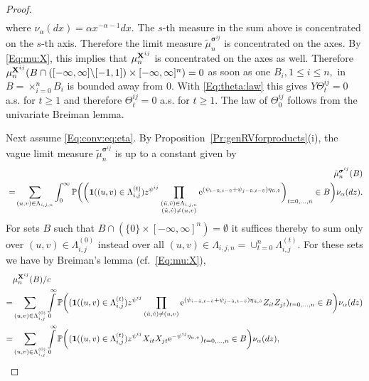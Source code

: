 \begin{proof}
\begin{eqnarray*}
\end{eqnarray*}
where $\nu_\alpha(dx)=\alpha x^{-\alpha-1}dx$. 
The $s$-th measure in the sum above is concentrated on the $s$-th axis. Therefore the limit measure $\tilde{\mu}^{\boldsymbol{\sigma}^{ij}}_n$ is
concentrated on the axes.
By \eqref{Eq:mu:X}, this implies that $\mu_n^{{\bf X}^{ij}}$ is concentrated on the axes as well. Therefore
$\mu_n^{{\bf X}^{ij}}(B \cap ([-\infty,\infty]\backslash [-1,1])\times [-\infty,\infty]^n)=0$ as soon as one $B_i, 1 \leq i \leq n,$ in $B=\times_{i=0}^n B_i$ is bounded away from 0. 
With \eqref{Eq:theta:law} this gives $Y \Theta_t^{ij}=0$ a.s. for $t \geq 1$ and therefore $\Theta_t^{ij}=0$ a.s. for $t \geq 1$. 
The law of $\Theta_0^{ij}$ follows from the univariate Breiman lemma. 
\par
Next assume \eqref{Eq:conv:eq:eta}. By Proposition~\ref{Pr:genRVforproducts}(i),  
the vague limit measure $\tilde{\mu}^{\boldsymbol{\sigma}^{ij}}_n$ is up to a constant given by 
\begin{eqnarray*} && \tilde{\mu}^{\boldsymbol{\sigma}^{ij}}_n(B) \\
&=&\hspace{-0.3cm} \sum_{(u,v) \in \Lambda_{i,j,n}}\int_0^\infty \P\bigg(\bigg(\I((u,v) \in \Lambda_{i,j}^{(t)})z^{\psi^{ij}}\prod_{\substack{(\tilde{u},\tilde{v}) \in \Lambda_{i,j,n} \\ (\tilde{u},\tilde{v}) \neq (u,v)}}\ex^{(\psi_{i-\tilde{u},t-\tilde{v}}+\psi_{j-\tilde{u},t-\tilde{v}})\eta_{\tilde{u},\tilde{v}}}\bigg)_{t=0, \ldots ,n} \in B \bigg)\nu_{\alpha}(dz).\end{eqnarray*}                                                                                                
For sets $B$ such that $B \cap (\{0\} \times [-\infty,\infty]^n)=\emptyset$ it suffices thereby to sum only 
over  $(u,v) \in \Lambda_{i,j}^{(0)}$ instead over all $(u,v) \in \Lambda_{i,j,n}=\cup_{t=0}^n\Lambda_{i,j}^{(t)}$.
For these sets we have by Breiman's lemma (cf.\ \eqref{Eq:mu:X}),
\begin{align*} & \mu^{{\bf X}^{ij}}_n(B)/c\\
= &\sum_{(u,v) \in \Lambda_{i,j}^{(0)}}\int\limits_0^\infty {\mathbb P}\bigg((\mathbf{1}((u,v) \in \Lambda_{i,j}^{(t)})z^{\psi^{ij}}\prod\limits_{(\tilde{u},\tilde{v}) \neq (u,v)}{\rm e}^{(\psi_{i-\tilde{u},t-\tilde{v}}+\psi_{j-\tilde{u},t-\tilde{v}})\eta_{\tilde{u},\tilde{v}}} Z_{it}Z_{jt})_{t=0, \ldots ,n} \in B \bigg)\nu_{\alpha}(dz)\\
= &\sum_{(u,v) \in \Lambda_{i,j}^{(0)}}\int\limits_0^\infty {\mathbb P}\bigg((\mathbf{1}((u,v) \in \Lambda_{i,j}^{(t)})z^{\psi^{ij}}X_{it}X_{jt}{\rm e}^{-\psi^{ij}\eta_{u,v}})_{t=0, \ldots ,n} \in B \bigg)\nu_{\alpha}(dz),\end{align*}

\end{proof}
